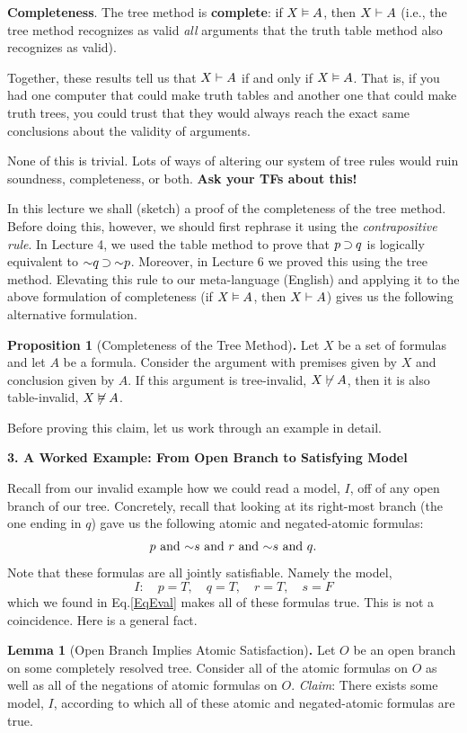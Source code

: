 \documentclass[options]{philosophersimprint}
\begin{document}
\textbf{Completeness}. The tree method is \textbf{complete}: if $X \vDash A$, then $X \vdash A$ (i.e., the tree method recognizes as valid \textit{all} arguments that the truth table method also recognizes as valid).

Together, these results tell us that $X \vdash A$ if and only if $X \vDash A$. That is, if you had one computer that could make truth tables and another one that could make truth trees, you could trust that they would always reach the exact same conclusions about the validity of arguments.

None of this is trivial. Lots of ways of altering our system of tree rules would ruin soundness, completeness, or both. \textbf{Ask your TFs about this!}

In this lecture we shall (sketch) a proof of the completeness of the tree method. Before doing this, however, we should first rephrase it using the \textit{contrapositive rule}. In Lecture 4, we used the table method to prove that $p\mathbin{\supset} q$ is logically equivalent to $\mathord{\sim} q\mathbin{\supset} \mathord{\sim} p$. Moreover, in Lecture 6 we proved this using the tree method. Elevating this rule to our meta-language (English) and applying it to the above formulation of completeness (if $X \vDash A$, then $X \vdash A$) gives us the following alternative formulation.

\textbf{Proposition 1} (Completeness of the Tree Method)\textbf{.} Let $X$ be a set of formulas and let $A$ be a formula. Consider the argument with premises given by $X$ and conclusion given by $A$. If this argument is tree-invalid, $X \not\vdash A$, then it is also table-invalid, $X \not\vDash A$.

Before proving this claim, let us work through an example in detail.

\textbf{3. A Worked Example: From Open Branch to Satisfying Model}

Recall from our invalid example how we could read a model, $I$, off of any open branch of our tree. Concretely, recall that looking at its right-most branch (the one ending in $q$) gave us the following atomic and negated-atomic formulas:
$$p \text{ and } \mathord{\sim} s \text{ and } r \text{ and } \mathord{\sim} s \text{ and } q.$$
Note that these formulas are all jointly satisfiable. Namely the model,
$$I: \quad p=T, \quad q=T, \quad  r=T, \quad  s=F$$
which we found in Eq.\eqref{EqEval} makes all of these formulas true. This is not a coincidence. Here is a general fact.

\textbf{Lemma 1} (Open Branch Implies Atomic Satisfaction)\textbf{.} Let $O$ be an open branch on some completely resolved tree. Consider all of the atomic formulas on $O$ as well as all of the negations of atomic formulas on $O$. \textit{Claim}: There exists some model, $I$, according to which all of these atomic and negated-atomic formulas are true.
\end{document}
